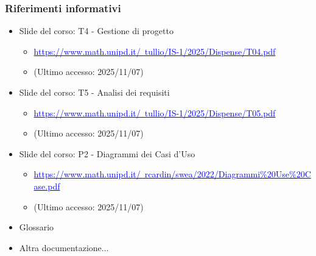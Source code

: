 \documentclass[a4paper,12pt]{article}
\begin{document}
{            \subsubsection{Riferimenti informativi}
                \begin{itemize}
                    \item Slide del corso: T4 - Gestione di progetto
                    \begin{itemize}
                        \item \href{https://www.math.unipd.it/~tullio/IS-1/2025/Dispense/T04.pdf}{\textcolor{blue} {https://www.math.unipd.it/~tullio/IS-1/2025/Dispense/T04.pdf}}
                        \item[] (Ultimo accesso: 2025/11/07)
                    \end{itemize}
                    \item Slide del corso: T5 - Analisi dei requisiti
                    \begin{itemize}
                        \item \href{https://www.math.unipd.it/~tullio/IS-1/2025/Dispense/T05.pdf}{\textcolor{blue} {https://www.math.unipd.it/~tullio/IS-1/2025/Dispense/T05.pdf}}
                        \item[] (Ultimo accesso: 2025/11/07)
                    \end{itemize}
                    \item Slide del corso: P2 - Diagrammi dei Casi d'Uso
                        \begin{itemize}
                            \item \href{https://www.math.unipd.it/~rcardin/swea/2022/Diagrammi\%20Use\%20Case.pdf}{\textcolor{blue}{https://www.math.unipd.it/~rcardin/swea/2022/Diagrammi\%20Use\%20Case.pdf}}
                            \item[] (Ultimo accesso: 2025/11/07)
                        \end{itemize}
                    \item Glossario
                    \item Altra documentazione...
                \end{itemize}
    }

    \newpage
\end{document}
